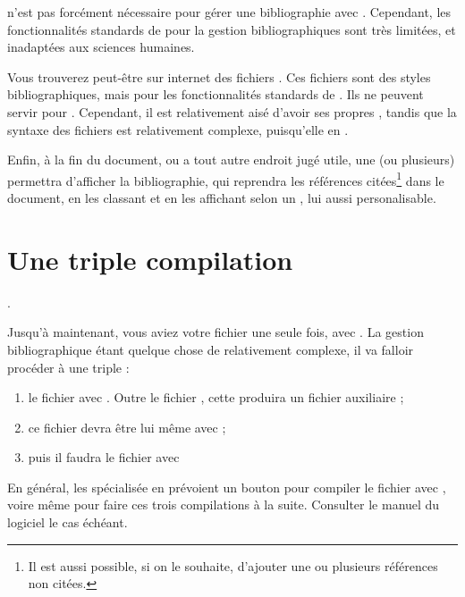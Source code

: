 \begin{anedocte}
 n'est pas forcément nécessaire pour gérer une bibliographie avec \logiciel{\LaTeX}. Cependant, les fonctionnalités standards de  pour la gestion bibliographiques sont très limitées, et inadaptées aux sciences humaines. 

Vous trouverez peut-être sur internet des fichiers . Ces fichiers sont des styles bibliographiques, mais pour les fonctionnalités standards de \logiciel{\LaTex}. Ils ne peuvent servir pour . Cependant, il est relativement aisé d'avoir ses propres , tandis que la syntaxe des fichiers  est relativement complexe, puisqu'elle en .
\end{anedocte}

Enfin, à la fin du document, ou a tout autre endroit jugé utile, une (ou plusieurs)  permettra d'afficher la bibliographie, qui reprendra les références citées\footnote{Il est aussi possible, si on le souhaite, d'ajouter une ou plusieurs références non citées.} dans le document, en les classant et en les affichant selon un , lui aussi personalisable.

\section{Une triple compilation}.

Jusqu'à maintenant, vous aviez  votre fichier  une seule fois, avec . La gestion bibliographique étant quelque chose de relativement complexe, il va falloir procéder à une triple  :
\begin{enumerate}
\item le fichier  avec . Outre le fichier , cette  produira un fichier auxiliaire  ;
\item ce fichier devra être lui même  avec  ;
\item puis il faudra  le fichier  avec 
\end{enumerate}

En général, les  spécialisée en \logiciel{\LaTeX} prévoient un bouton pour compiler le fichier  avec , voire même pour faire ces trois compilations à la suite. Consulter le manuel du logiciel le cas échéant.

